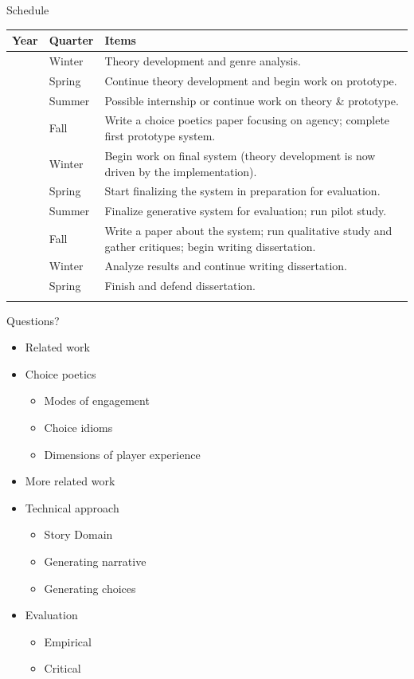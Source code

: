 \documentclass[xcolor=x11names]{beamer}
\begin{document}
\begin{frame}{Schedule}

  \tiny
\begin{tabular}{r l p{2in}}
\toprule
Year & Quarter & Items \\
\midrule \addlinespace[0.5em]
2014 & Winter & Theory development and genre analysis. \\ \addlinespace[0.5em]
     & Spring & Continue theory development and begin work on prototype. \\ \addlinespace[0.5em]
     & Summer & Possible internship or continue work on theory \& prototype. \\ \addlinespace[0.5em]
     & Fall & Write a choice poetics paper focusing on agency; complete first prototype system. \\ \addlinespace[0.5em] \midrule \addlinespace[0.6em]
2015 & Winter & Begin work on final system (theory development is now driven by the implementation). \\ \addlinespace[0.5em]
     & Spring & Start finalizing the system in preparation for evaluation. \\ \addlinespace[0.5em]
     & Summer & Finalize generative system for evaluation; run pilot study. \\ \addlinespace[0.5em]
     & Fall & Write a paper about the system; run qualitative study and gather critiques; begin writing dissertation. \\ \addlinespace[0.5em] \midrule \addlinespace[0.6em]
2016 & Winter & Analyze results and continue writing dissertation. \\ \addlinespace[0.5em]
     & Spring & Finish and defend dissertation. \\ \addlinespace[0.5em]
\bottomrule
\end{tabular}
\end{frame}

\begin{frame}{Questions?}
  \begin{itemize}
    \item Related work
    \item Choice poetics
    \begin{itemize}
      \item Modes of engagement
      \item Choice idioms
      \item Dimensions of player experience
    \end{itemize}
    \item More related work
    \item Technical approach
    \begin{itemize}
      \item Story Domain
      \item Generating narrative
      \item Generating choices
    \end{itemize}
  \item Evaluation
    \begin{itemize}
      \item Empirical
      \item Critical
    \end{itemize}
  \end{itemize}
\end{frame}
\end{document}
